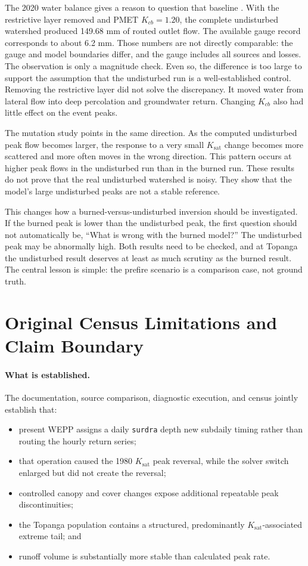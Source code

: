 \documentclass[11pt]{article}
\newcommand{\Ksat}{\ensuremath{K_{\mathrm{sat}}}}
\newcommand{\surdra}{\texttt{surdra}}
\begin{document}
The 2020 water balance gives a reason to question that baseline
\cite{handoff}. With the restrictive layer removed and PMET $K_{cb}=1.20$, the
complete undisturbed watershed produced 149.68 mm of routed outlet flow. The
available gauge record corresponds to about 6.2 mm. Those numbers are not
directly comparable: the gauge and model boundaries differ, and the gauge
includes all sources and losses. The observation is only a magnitude check.
Even so, the difference is too large to support the assumption that the
undisturbed run is a well-established control. Removing the restrictive layer
did not solve the discrepancy. It moved water from lateral flow into deep
percolation and groundwater return. Changing $K_{cb}$ also had little effect on
the event peaks.

The mutation study points in the same direction. As the computed undisturbed
peak flow becomes larger, the response to a very small \Ksat{} change becomes
more scattered and more often moves in the wrong direction. This pattern
occurs at higher peak flows in the undisturbed run than in the burned run.
These results do not prove that the real undisturbed watershed is noisy. They
show that the model's large undisturbed peaks are not a stable reference.

This changes how a burned-versus-undisturbed inversion should be investigated.
If the burned peak is lower than the undisturbed peak, the first question
should not automatically be, ``What is wrong with the burned model?'' The
undisturbed peak may be abnormally high. Both results need to be checked, and
at Topanga the undisturbed result deserves at least as much scrutiny as the
burned result. The central lesson is simple: the prefire scenario is a
comparison case, not ground truth.

\section{Original Census Limitations and Claim Boundary}

\paragraph{What is established.}
The documentation, source comparison, diagnostic execution, and census jointly
establish that:

\begin{itemize}
  \item present WEPP assigns a daily \surdra{} depth new subdaily timing rather
    than routing the hourly return series;
  \item that operation caused the 1980 \Ksat{} peak reversal, while the solver
    switch enlarged but did not create the reversal;
  \item controlled canopy and cover changes expose additional repeatable peak
    discontinuities;
  \item the Topanga population contains a structured, predominantly
    \Ksat{}-associated extreme tail; and
  \item runoff volume is substantially more stable than calculated peak rate.
\end{itemize}
\end{document}
